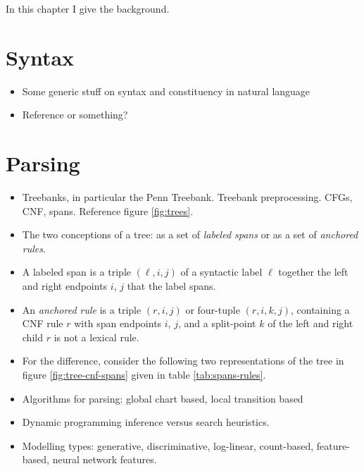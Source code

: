 % 

In this chapter I give the background.

\section{Syntax}
\begin{itemize}
  \item Some generic stuff on syntax and constituency in natural language
  \item Reference \citep{Carnie2010:constituent,Everaert+2015:structures} or something?
\end{itemize}

\section{Parsing}
\begin{itemize}
  \item Treebanks, in particular the Penn Treebank. Treebank preprocessing. CFGs, CNF, spans. Reference figure \ref{fig:trees}.
  \item The two conceptions of a tree: as a set of \textit{labeled spans} or as a set of \textit{anchored rules}.
  \item A labeled span is a triple $(\ell, i, j)$ of a syntactic label $\ell$ together the left and right endpoints $i$, $j$ that the label spans.
  \item An \textit{anchored rule} is a triple $(r, i, j)$ or four-tuple $(r, i, k, j)$, containing a CNF rule $r$ with span endpoints $i$, $j$, and a split-point $k$ of the left and right child $r$ is not a lexical rule.
  \item For the difference, consider the following two representations of the tree in figure \ref{fig:tree-cnf-spans} given in table \ref{tab:spans-rules}.
  \item Algorithms for parsing: global chart based, local transition based
  \item Dynamic programming inference versus search heuristics.
  \item Modelling types: generative, discriminative, log-linear, count-based, feature-based, neural network features.
\end{itemize}

